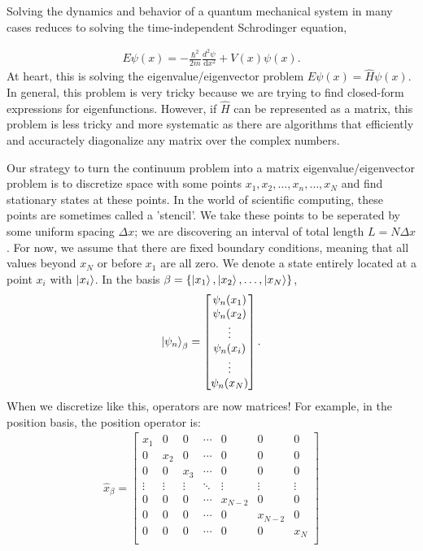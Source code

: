 \documentclass[10pt]{article}
\newcommand{\1}{\mathbf 1}
\begin{document}
Solving the dynamics and behavior of a quantum mechanical system in many cases reduces to solving the time-independent Schrodinger equation,

\begin{align}
E \psi(x) = - \frac{\hbar^2}{2m} \frac{d^2\psi}{\,\mathrm{d} x^2} + V(x) \psi(x).
\end{align}
At heart, this is solving the eigenvalue/eigenvector problem $E\psi(x) = \hat H \psi(x)$.
In general, this problem is very tricky because we are trying to find closed-form expressions for eigenfunctions.
However, if $\hat H$ can be represented as a matrix, this problem is less tricky and more systematic as there are algorithms that efficiently and accuractely diagonalize any matrix over the complex numbers.

Our strategy to turn the continuum problem into a matrix eigenvalue/eigenvector problem is to discretize space with some points $x_1,x_2,\dots,x_n,\dots,x_N$ and find stationary states at these points.
In the world of scientific computing, these points are sometimes called a 'stencil'.
We take these points to be seperated by some uniform spacing $\Delta x$; we are discovering an interval of total length $L = N\Delta x$.
For now, we assume that there are fixed boundary conditions, meaning that all values beyond $x_N$ or before $x_1$ are all zero.
We denote a state entirely located at a point $x_i$ with $\ket{x_i}$. 
In the basis $\beta = \{\ket{x_1},\ket{x_2},\dots,\ket{x_N}\}$,
\begin{align}
\ket{\psi_n}_\beta
=
\begin{bmatrix}
\psi_n(x_1)\\
\psi_n(x_2)\\
\vdots\\
\psi_n(x_i)\\
\vdots\\
\psi_n(x_N)\\
\end{bmatrix}.
\end{align}
When we discretize like this, operators are now  matrices!
For example, in the position basis, the position operator is:
\begin{align}
\hat x_\beta
=
\begin{bmatrix}
x_1 & 0 & 0  & \cdots &0 & 0 & 0 \\
0 & x_2 & 0 & \cdots &0 & 0 & 0\\
0 & 0 & x_3 & \cdots & 0 & 0 & 0\\
\vdots & \vdots & \vdots & \ddots & \vdots & \vdots & \vdots\\
0 & 0 & 0 & \cdots & x_{N-2} & 0&0\\
0 & 0 & 0 & \cdots & 0 & x_{N-2} & 0\\
0 & 0 & 0 & \cdots & 0 & 0& x_{N}\\
\end{bmatrix}
\end{align}
\end{document}
